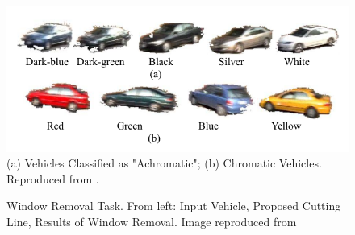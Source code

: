 \begin{figure}[hbt!]
 \centering
 \includegraphics[width=.8\textwidth]{image/lit/carscolors.png}
 \caption[Colour Appearance Categories of Vehicle Used for Colour
 Classification]{(a) Vehicles Classified as "Achromatic";
 (b) Chromatic Vehicles. Reproduced from .}
\label{fig:sevenclasses}
\end{figure}

\begin{figure}[!htb]
 \centering {}
 \caption[Window Removal Task. From left: Input
Vehicle, Proposed Cutting Line, Results of Window Removal]{Window Removal Task.
From left: Input Vehicle, Proposed Cutting Line, Results of Window Removal.
Image reproduced from 
 \label{fig:windowremoval}}
\end{figure}

